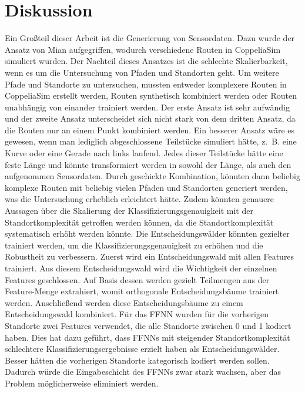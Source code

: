 \chapter{Diskussion}
\label{chapter:discussion}
Ein Großteil dieser Arbeit ist die Generierung von Sensordaten.
Dazu wurde der Ansatz von Mian aufgegriffen, wodurch verschiedene Routen in CoppeliaSim simuliert wurden.
Der Nachteil dieses Ansatzes ist die schlechte Skalierbarkeit, wenn es um die Untersuchung von Pfaden und Standorten geht.
Um weitere Pfade und Standorte zu untersuchen, mussten entweder komplexere Routen in CoppeliaSim erstellt werden,
Routen synthetisch kombiniert werden oder Routen unabhängig von einander trainiert werden.
\newline
\newline
Der erste Ansatz ist sehr aufwändig und der zweite Ansatz unterscheidet sich nicht stark von dem dritten Ansatz,
da die Routen nur an einem Punkt kombiniert werden.
Ein besserer Ansatz wäre es gewesen, wenn man lediglich abgeschlossene Teilstücke simuliert hätte,
z.~B. eine Kurve oder eine Gerade nach links laufend.
Jedes dieser Teilstücke hätte eine feste Länge und könnte transformiert werden in sowohl der Länge, als auch den aufgenommen Sensordaten.
Durch geschickte Kombination, könnten dann beliebig komplexe Routen mit beliebig vielen Pfaden und Standorten generiert werden,
was die Untersuchung erheblich erleichtert hätte.
Zudem könnten genauere Aussagen über die Skalierung der Klassifizierungsgenauigkeit mit der Standortkomplexität getroffen werden können,
da die Standortkomplexität systematisch erhöht werden könnte.
\newline
\newline
Die Entscheidungswälder könnten gezielter trainiert werden, um die Klassifizierungsgenauigkeit zu erhöhen und die Robustheit zu verbessern.
Zuerst wird ein Entscheidungswald mit allen Features trainiert.
Aus diesem Entscheidungswald wird die Wichtigkeit der einzelnen Features geschlossen.
Auf Basis dessen werden gezielt Teilmengen aus der Feature-Menge extrahiert, womit orthogonale Entscheidungsbäume trainiert werden.
Anschließend werden diese Entscheidungsbäume zu einem Entscheidungswald kombiniert.
\newpage
Für das FFNN wurden für die vorherigen Standorte zwei Features verwendet, die alle Standorte zwischen 0 und 1 kodiert haben.
Dies hat dazu geführt, dass FFNNs mit steigender Standortkomplexität schlechtere Klassifizierungsergebnisse erzielt haben als Entscheidungswälder.
Besser hätten die vorherigen Standorte kategorisch kodiert werden sollen.
Dadurch würde die Eingabeschicht des FFNNs zwar stark wachsen, aber das Problem möglicherweise eliminiert werden.
